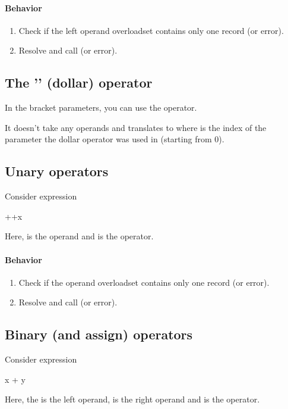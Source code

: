 \paragraph{Behavior}
\begin{enumerate}
	\item Check if the left operand overloadset contains only one record (or error).
	\item Resolve and call  (or error).
\end{enumerate}

\subsection{The '\inlineCode{\$}' (dollar) operator}
In the bracket parameters, you can use the \inlineCode{\$} operator.

It doesn't take any operands and translates to  where  is the index of the parameter the dollar operator was used in (starting from 0).

\subsection{Unary operators}
Consider expression
\begin{code}
	++x
\end{code}

Here,  is the operand and \inlineCode{++} is the operator.

\paragraph{Behavior}
\begin{enumerate}
	\item Check if the operand overloadset contains only one record (or error).
	\item Resolve and call  (or error).
\end{enumerate}

\subsection{Binary (and assign) operators}
Consider expression
\begin{code}
	x + y
\end{code}

Here, the  is the left operand,  is the right operand and \inlineCode{+} is the operator.

